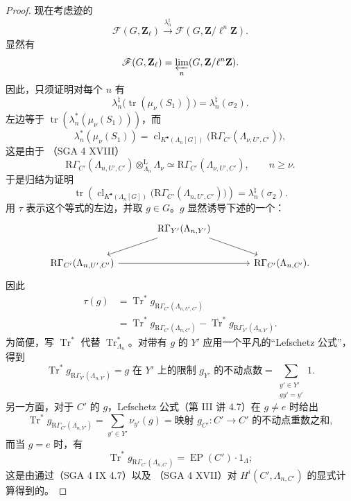 \begin{proof}
现在考虑迹的
\[
\mathscr F(G,\mathbf Z_\ell)\xrightarrow{\lambda_n^\natural}
\mathscr F(G,\mathbf Z/\ell^n\mathbf Z).
\]
显然有
\[
\mathscr F(G,\mathbf Z_\ell)=\varprojlim_n(G,\mathbf Z/\ell^n\mathbf Z).
\]
因此，只须证明对每个 $n$ 有
\[
\lambda_n^\natural\bigl(\operatorname{tr}(\mu_\nu(S_1))\bigr)
=\lambda_n^\natural(\sigma_2).
\]
左边等于 $\operatorname{tr}(\lambda_n^*(\mu_\nu(S_1)))$，而
\[
\lambda_n^*(\mu_\nu(S_1))=
\operatorname{cl}_{K^\bullet(\Lambda_n[G])}
\bigl(\mathrm R\Gamma_{C'}(\Lambda_{\nu,U',C'})\bigr),
\]
这是由于 （SGA 4 XVIII）
\[
\mathrm R\Gamma_{C'}(\Lambda_{n,U',C'})\otimes_{\Lambda_n}^{\mathrm L}\Lambda_\nu
\simeq\mathrm R\Gamma_{C'}(\Lambda_{\nu,U',C'}),\qquad n\geq\nu.
\]
于是归结为证明
\[
\operatorname{tr}\left(\operatorname{cl}_{K^\bullet(\Lambda_n[G])}
\bigl(\mathrm R\Gamma_{C'}(\Lambda_{n,U',C'})\bigr)\right)
=\lambda_n^\natural(\sigma_2).
\]
用 $\tau$ 表示这个等式的左边，并取 $g\in G$。$g$ 显然诱导下述的一个：
\[
\begin{tikzcd}[column sep=large]
&\mathrm R\Gamma_{Y'}(\Lambda_{n,Y'})\arrow[dl]\arrow[dr]&\\
\mathrm R\Gamma_{C'}(\Lambda_{n,U',C'})\arrow[rr]&&\mathrm R\Gamma_{C'}(\Lambda_{n,C'}).
\end{tikzcd}
\]
因此
\[
\begin{aligned}
\tau(g)&=\operatorname{Tr}^*g_{\mathrm R\Gamma_{C'}(\Lambda_{n,U',C'})}\\
&=\operatorname{Tr}^*g_{\mathrm R\Gamma_{C'}(\Lambda_{n,C'})}
-\operatorname{Tr}^*g_{\mathrm R\Gamma_{Y'}(\Lambda_{n,Y'})}.
\end{aligned}
\]
为简便，写 $\operatorname{Tr}^*$ 代替 $\operatorname{Tr}_{\Lambda_n}^*$。对带有 $g$ 的 $Y'$ 应用一个平凡的“Lefschetz 公式”，得到
\[
\operatorname{Tr}^*g_{\mathrm R\Gamma_{Y'}(\Lambda_{n,Y'})}
=\text{$g$ 在 $Y'$ 上的限制 $g_{Y'}$ 的不动点数}
=\sum_{\substack{y'\in Y'\\gy'=y'}}1.
\]
另一方面，对于 $C'$ 的 $g$，Lefschetz 公式（第 III 讲 4.7）在 $g\ne e$ 时给出
\[
\operatorname{Tr}^*g_{\mathrm R\Gamma_{C'}(\Lambda_{n,Y'})}
=\sum_{y'\in Y'}\nu_{y'}(g)
=\text{映射 $g_{C'}:C'\longrightarrow C'$ 的不动点重数之和},
\]
而当 $g=e$ 时，有
\[
\operatorname{Tr}^*g_{\mathrm R\Gamma_{C'}(\Lambda_{n,C'})}
=\operatorname{EP}(C')\cdot1_\Lambda;
\]
这是由通过（SGA 4 IX 4.7）以及
（SGA 4 XVII）对 $H^i(C',\Lambda_{n,C'})$ 的显式计算得到的。


\end{proof}
